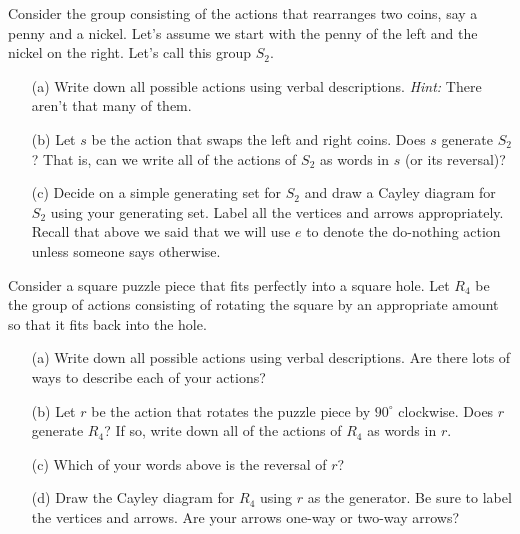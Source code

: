 \begin{exercise}\label{exer:introducing_S2}
Consider the group consisting of the actions that rearranges two coins, say a penny and a nickel.  Let's assume we start with the penny of the left and the nickel on the right.  Let's call this group $S_2$.

\begin{enumerate}
\item[(a)] Write down all possible actions using verbal descriptions.  \emph{Hint:} There aren't that many of them.
\item[(b)] Let $s$ be the action that swaps the left and right coins.  Does $s$ generate $S_2$?  That is, can we write all of the actions of $S_2$ as words in $s$ (or its reversal)?
\item[(c)] Decide on a simple generating set for $S_2$ and draw a Cayley diagram for $S_2$ using your generating set.  Label all the vertices and arrows appropriately.  Recall that above we said that we will use $e$ to denote the do-nothing action unless someone says otherwise.
\end{enumerate}
\end{exercise}

\begin{exercise}\label{exer:introducing_R4}
Consider a square puzzle piece that fits perfectly into a square hole.  Let $R_4$ be the group of actions consisting of rotating the square by an appropriate amount so that it fits back into the hole.
\begin{enumerate}
\item[(a)] Write down all possible actions using verbal descriptions.  Are there lots of ways to describe each of your actions?
\item[(b)] Let $r$ be the action that rotates the puzzle piece by $90^\circ$ clockwise.  Does $r$ generate $R_4$?  If so, write down all of the actions of $R_4$ as words in $r$.
\item[(c)] Which of your words above is the reversal of $r$?
\item[(d)] Draw the Cayley diagram for $R_4$ using $r$ as the generator.  Be sure to label the vertices and arrows.  Are your arrows one-way or two-way arrows?
\end{enumerate}
\end{exercise}


